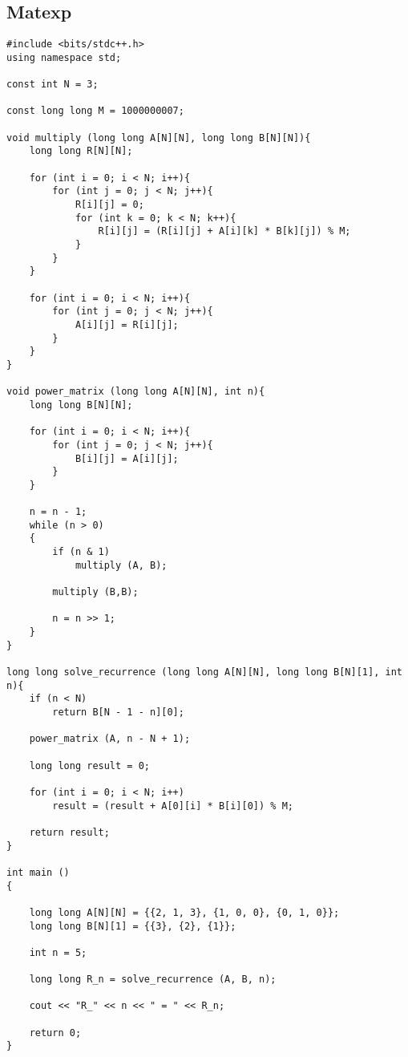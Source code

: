 \documentclass{article}
\begin{document}
\subsection{Matexp}
\begin{lstlisting}
#include <bits/stdc++.h>
using namespace std;

const int N = 3;

const long long M = 1000000007;

void multiply (long long A[N][N], long long B[N][N]){
    long long R[N][N];

    for (int i = 0; i < N; i++){
        for (int j = 0; j < N; j++){
            R[i][j] = 0;
            for (int k = 0; k < N; k++){
                R[i][j] = (R[i][j] + A[i][k] * B[k][j]) % M;
            }
        }
    }

    for (int i = 0; i < N; i++){
        for (int j = 0; j < N; j++){
            A[i][j] = R[i][j];
        }
    }
}

void power_matrix (long long A[N][N], int n){
    long long B[N][N];

    for (int i = 0; i < N; i++){
        for (int j = 0; j < N; j++){
            B[i][j] = A[i][j];
        }
    }

    n = n - 1;
    while (n > 0)
    {
        if (n & 1)
            multiply (A, B);

        multiply (B,B);

        n = n >> 1;  
    }
}

long long solve_recurrence (long long A[N][N], long long B[N][1], int n){
    if (n < N)
        return B[N - 1 - n][0];
    
    power_matrix (A, n - N + 1);
    
    long long result = 0;
    
    for (int i = 0; i < N; i++)
        result = (result + A[0][i] * B[i][0]) % M;
    
    return result;
}

int main ()
{

    long long A[N][N] = {{2, 1, 3}, {1, 0, 0}, {0, 1, 0}};
    long long B[N][1] = {{3}, {2}, {1}};
    
    int n = 5;
    
    long long R_n = solve_recurrence (A, B, n);
    
    cout << "R_" << n << " = " << R_n; 

    return 0;
}
\end{lstlisting}
\end{document}
